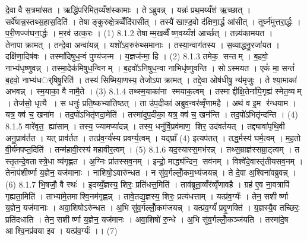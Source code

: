 दे॒वा वै स॒त्रमा॑सत । ऋद्धि॑परिमित॒य्यँश॑स्कामाः । तेऽब्रुवन्न् । यन्नः॑ प्रथ॒मय्यँश॑ ऋ॒च्छात् । सर्वे॑षान्न॒स्तथ्स॒हास॒दिति॑ । तेषाङ्कुरुक्षे॒त्रव्वेँदि॑रासीत् । तस्यै॑ खाण़्ड॒वो द॑क्षिणा॒र्द्ध आ॑सीत् । तूर्घ्न॑मुत्तरा॒र्द्धः । प॒री॒णज्ज॑घना॒र्द्धः । म॒रव॑ उत्क॒रः । (1)
8.1.2
तेषाम्म॒खव्वैँष्ण॒वय्यँश॑ आर्च्छत् । तन्न्य॑कामयत । तेनापाक्रामत् । तन्दे॒वा अन्वा॑यन्न् । यशो॑ऽव॒रुरु॑थ्समानाः । तस्या॒न्वाग॑तस्य । स॒व्याद्धनु॒रजा॑यत । दक्षि॑णा॒दिष॑वः । तस्मा॑दिषुध॒न्वं पुण्य॑जन्म । य॒ज्ञज॑न्मा॒ हि । (2)
8.1.3
तमेक॒ सन्तम् । ब॒हवो॒ नाभ्य॑धृष्णुवन्न् । तस्मा॒देक॑मिषुध॒न्विनम् । ब॒हवो॑ऽनिषुध॒न्वा नाभिधृ॑ष्णुवन्ति । सोऽस्मयत । एकं॑ मा॒ सन्तं॑ ब॒हवो॒ नाभ्य॑धर््षिषु॒रिति॑ । तस्य॑ सिष्मिया॒णस्य॒ तेजोऽपाक्रामत् । तद्दे॒वा ओष॑धीषु॒ न्य॑मृजुः । ते श्या॒माका॑ अभवन्न् । स्म॒याका॒ वै नामै॒ते । (3)
8.1.4
तथ्स्म॒याका॑ना स्मयाक॒त्वम् । तस्माद्दीक्षि॒तेना॑पि॒गृह्य॑ स्मेत॒व्यम् । तेज॑सो॒ धृत्यै । स धनुः॑ प्रति॒ष्कभ्या॑तिष्ठत् । ता उ॑प॒दीका॑ अब्रुव॒न्वर॑व्वृँणामहै । अथ॑ व इ॒म र॑न्धयाम । यत्र॒ क्व॑ च॒ खना॑म । तद॒पो॑ऽभितृ॑णदा॒मेति॑ । तस्मा॑दुप॒दीका॒ यत्र॒ क्व॑ च॒ खन॑न्ति । तद॒पो॑ऽभितृ॑न्दन्ति । (4)
8.1.5
वारे॑वृत॒ ह्या॑साम् । तस्य॒ ज्यामप्या॑दन्न् । तस्य॒ धनु॑र्वि॒प्रव॑माण॒ शिर॒ उद॑वर्तयत् । तद्द्यावा॑पृथि॒वी अनु॒प्राव॑र्तत । यत् प्राव॑र्तत । तत्प्र॑व॒र्ग्य॑स्य प्रवर्ग्य॒त्वम् । यद्घ्राँ (4) इत्यप॑तत् । तद्ध॒र्मस्य॑ घर्म॒त्वम् । म॒ह॒तो वी॒र्य॑मपप्त॒दिति॑ । तन्म॑हावी॒रस्य॑ महावीर॒त्वम् । (5)
8.1.6
यद॒स्यास्स॒मभ॑रन्न् । तथ्स॒म्राज्ञ॑स्सम्रा॒ट्त्वम् । त स्तृ॒तन्दे॒वतास्त्रे॒धा व्य॑गृह्णत । अ॒ग्निः प्रा॑तस्सव॒नम् । इन्द्रो॒ माद्ध्य॑न्दिन॒ सव॑नम् । विश्वे॑दे॒वास्तृ॑तीयसव॒नम् । तेनाप॑शीर्ष्णा य॒ज्ञेन॒ यज॑मानाः । नाशिषो॒ऽवारु॑न्धत । न सु॑व॒र्गल्लोँ॒कम॒भ्य॑जयन्न् । ते दे॒वा अ॒श्विना॑वब्रुवन्न् । (6)
8.1.7
भि॒षजौ॒ वै स्थः॑ । इ॒दय्यँ॒ज्ञस्य॒ शिरः॒ प्रति॑धत्त॒मिति॑ । ताव॑ब्रूता॒व्वँर॑व्वृँणावहै । ग्रह॑ ए॒व ना॒वत्रापि॑ गृह्यता॒मिति॑ । ताभ्या॑मे॒तमाश्वि॒नम॑गृह्णन्न् । तावे॒तद्य॒ज्ञस्य॒ शिरः॒ प्रत्य॑धत्ताम् । यत्प्र॑व॒र्ग्यः॑ । तेन॒ सशीर्ष्णा य॒ज्ञेन॒ यज॑मानाः । अवा॒शिषोऽरु॑न्धत । अ॒भि सु॑व॒र्गल्लोँ॒कम॑जयन्न् । यत्प्र॑व॒र्ग्यं॑ प्रवृ॒णक्ति॑ । य॒ज्ञस्यै॒व तच्छिरः॒ प्रति॑दधाति । तेन॒ सशीर्ष्णा य॒ज्ञेन॒ यज॑मानः । अवा॒शिषो॑ रु॒न्धे । अ॒भि सु॑व॒र्गल्लोँ॒कञ्ज॑यति । तस्मा॑दे॒ष आश्वि॒नप्र॑वया इव । यत्प्र॑व॒र्ग्यः॑ ।। (7)
\anuvakamend


